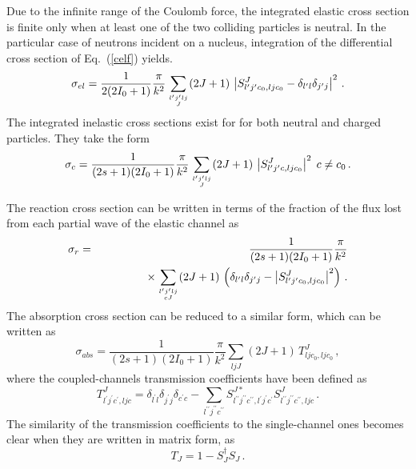 \documentclass[twocolumn,amsmath,amssymb,10pt,groupedaddress,a4paper]{revtex4}
\begin{document}
Due to the infinite range of the Coulomb force, the integrated elastic
cross section is finite only when at least one of the two colliding
particles is neutral. In the particular case of neutrons incident
on a nucleus, integration of the differential cross section of Eq.~(\ref{celf})
yields. \begin{equation}
\sigma_{el}=\frac{1}{2(2I_{0}+1)}\frac{\pi}{k^{2}}\sum_{{{l^{\prime}j^{\prime}lj\atop J}}}(2J+1)\,\left|S_{l^{\prime}j^{\prime}c_{0},ljc_{0}}^{J}-\delta_{l^{\prime}l}\delta_{j^{\prime}j}\right|^{2}\,.\end{equation}
 The integrated inelastic cross sections exist for for both neutral
and charged particles. They take the form \begin{equation}
\sigma_{c}=\frac{1}{(2s+1)(2I_{0}+1)}\frac{\pi}{k^{2}}\sum_{{{l^{\prime}j^{\prime}lj\atop J}}}(2J+1)\,\left|S_{l^{\prime}j^{\prime}c,ljc_{0}}^{J}\right|^{2}\; c\neq c_{0}\,.\end{equation}

The reaction cross section can be written in terms of the fraction of
the flux lost from each partial wave of the elastic channel as
\begin{eqnarray}
\sigma_{r} & = & \frac{1}{(2s+1)(2I_{0}+1)}\frac{\pi}{k^{2}} \\
& & \qquad\qquad\times\sum_{{{l^{\prime}j^{\prime}lj\atop cJ}}}(2J+1)\,\left(\delta_{l^{\prime}l}\delta_{j^{\prime}j}-\left|S_{l^{\prime}j^{\prime}c_{0},ljc_{0}}^{J}\right|^{2}\right)\,.\nonumber\end{eqnarray}
The absorption cross section can be reduced to a similar
form, which can be written as \begin{equation}
\sigma_{abs}=\frac{1}{(2s+1)(2I_{0}+1)}\frac{\pi}{k^{2}}\sum_{ljJ}(2J+1)\, T_{ljc_{0},ljc_{0}}^{J}\,,\end{equation}
 where the coupled-channels transmission coefficients have been
defined as \begin{equation}
T_{l^{\prime}j^{\prime}c^{\prime},ljc}^{J}=\delta_{l^{\prime}l}\delta_{j^{\prime}j}\delta_{c^{\prime}c}-\sum_{l^{\prime\prime}j^{\prime\prime}c^{\prime\prime}}S_{l^{\prime\prime}j^{\prime\prime}c^{\prime\prime},l^{\prime}j^{\prime}c^{\prime}}^{J*}S_{l^{\prime\prime}j^{\prime\prime}c^{\prime\prime},ljc}^{J}\,.\end{equation}
 The similarity of the transmission coefficients to the single-channel
ones becomes clear when they are written in matrix form, as \begin{equation}
T_{J}=1-S_{J}^{\dagger}S_{J}\,.\end{equation}
\end{document}
